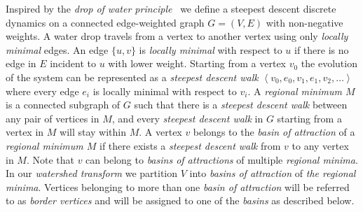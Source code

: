 \documentclass[10pt, conference, compsocconf]{IEEEtran}
\begin{document}
Inspired by the \emph{drop of water principle}~\cite{Cousty2009} we
define a steepest descent discrete dynamics on a connected
edge-weighted graph $G=(V,E)$ with non-negative weights. A water drop
travels from a vertex to another vertex using only \emph{locally
  minimal} edges. An edge $\{u,v\}$ is \emph{locally minimal} with
respect to $u$ if there is no edge in $E$ incident to $u$ with lower
weight. Starting from a vertex $v_{0}$ the evolution of the system can
be represented as a \emph{steepest descent walk} $\left\langle
v_{0},e_{0},v_{1},e_{1},v_{2}, \dots \right\rangle$ where every edge
$e_{i}$ is locally minimal with respect to $v_{i}.$ A \emph{regional
  minimum $M$} is a connected subgraph of $G$ such that there is a
\emph{steepest descent walk} between any pair of vertices in $M$, and
every \emph{steepest descent walk} in $G$ starting from a vertex in
$M$ will stay within $M$. A vertex $v$ belongs to the \emph{basin of
  attraction} of a \emph{regional minimum $M$} if there exists a
\emph{steepest descent walk} from $v$ to any vertex in $M$. Note that
$v$ can belong to \emph{basins of attractions} of multiple
\emph{regional minima}. In our \emph{watershed transform} we partition
$V$ into \emph{basins of attraction} of \emph{the regional
  minima}. Vertices belonging to more than one \emph{basin of
  attraction} will be referred to as \emph{border vertices} and will
be assigned to one of the \emph{basins} as described below.
\end{document}
